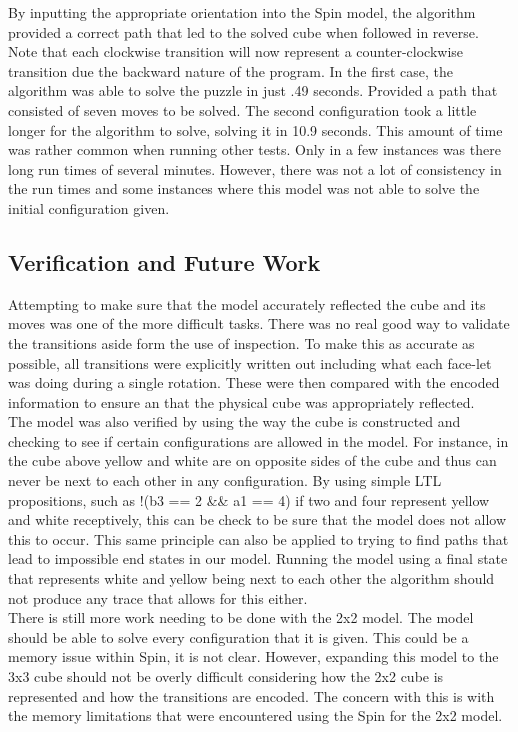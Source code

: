 \documentclass{article}
\begin{document}
By inputting the appropriate orientation into the Spin model, the algorithm provided a correct path that led to the solved cube when followed in reverse. Note that each clockwise transition will now represent a counter-clockwise transition due the backward nature of the program. In the first case, the algorithm was able to solve the puzzle in just .49 seconds. Provided a path that consisted of seven moves to be solved.  The second configuration took a little longer for the algorithm to solve, solving it in 10.9 seconds. This amount of time was rather common when running other tests. Only in a few instances was there long run times of several minutes. However, there was not a lot of consistency in the run times and some instances where this model was not able to solve the initial configuration given.
\subsection{Verification and Future Work}
Attempting to make sure that the model accurately reflected the cube and its moves was one of the more difficult tasks. There was no real good way to validate the transitions aside form the use of inspection. To make this as accurate as possible, all transitions were explicitly written out including what each face-let was doing during a single rotation. These were then compared with the encoded information to ensure an that the physical cube was appropriately reflected. \\[3mm]
The model was also verified by using the way the cube is constructed and checking to see if certain configurations are allowed in the model. For instance, in the cube above yellow and white are on opposite sides of the cube and thus can never be next to each other in any configuration. By using simple LTL propositions, such as !(b3 == 2 \&\& a1 == 4) if two and four represent yellow and white receptively, this can be check to be sure that the model does 
not allow this to occur. This same principle can also be applied to trying to find paths that lead to impossible end states in our model. Running the model using a final state that represents white and yellow being next to each other the algorithm should not produce any trace that allows for this either. \\[3mm]
There is still more work needing to be done with the 2x2 model. The model should be able to solve every configuration that it is given. This could be a memory issue within Spin, it is not clear. However, expanding this model to the 3x3 cube should not be overly difficult considering how the 2x2 cube is represented and how the transitions are encoded.  The concern with this is with the memory limitations that were encountered using the Spin for the 2x2 model. 
\end{document}
